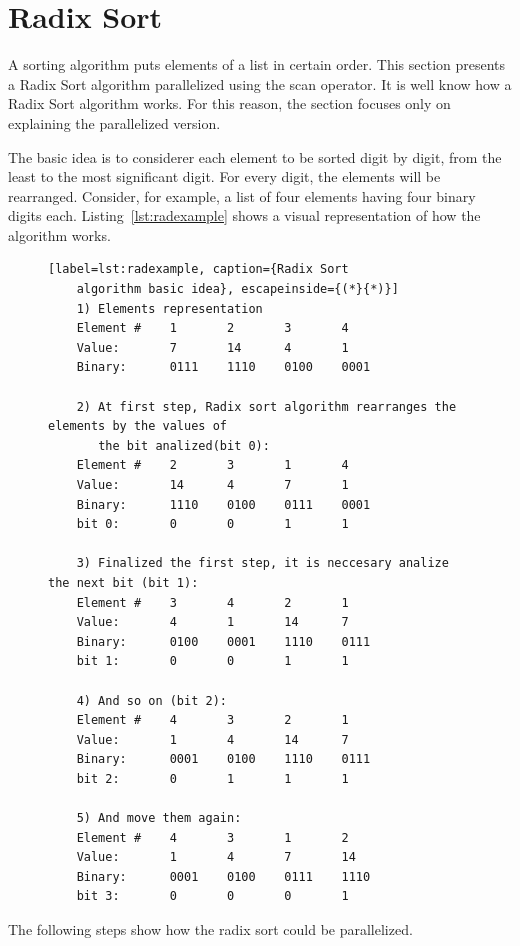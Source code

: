 \documentclass[Ingles]{ic-tese-v1}
\newcommand{\rlst}[1]{Listing~\ref{lst:#1}}
\begin{document}
\section{Radix Sort}
\label{sec:Quicksort}

A sorting algorithm puts elements of a list in certain order. This section
presents a Radix Sort algorithm parallelized using the scan operator. It is
well know how a Radix Sort algorithm works.  For this reason, the section
focuses only on explaining the parallelized version.

The basic idea is to considerer each element to be sorted digit by digit, from
the least to the most significant digit. For every digit, the elements will be rearranged.
Consider, for example, a list of four elements having four binary digits each.
\rlst{radexample} shows a visual representation of how the
algorithm works.

\begin{figure}[t]
	\lstset{basicstyle=\scriptsize}
	\begin{lstlisting}[label=lst:radexample, caption={Radix Sort
	algorithm basic idea}, escapeinside={(*}{*)}]
	1) Elements representation
	Element #    1       2       3       4
	Value:       7       14      4       1
	Binary:      0111    1110    0100    0001

	2) At first step, Radix sort algorithm rearranges the elements by the values of
	   the bit analized(bit 0):
	Element #    2       3       1       4
	Value:       14      4       7       1
	Binary:      1110    0100    0111    0001
	bit 0:       0       0       1       1

	3) Finalized the first step, it is neccesary analize the next bit (bit 1):
	Element #    3       4       2       1
	Value:       4       1       14      7
	Binary:      0100    0001    1110    0111
	bit 1:       0       0       1       1

	4) And so on (bit 2):
	Element #    4       3       2       1
	Value:       1       4       14      7
	Binary:      0001    0100    1110    0111
	bit 2:       0       1       1       1

	5) And move them again:
	Element #    4       3       1       2
	Value:       1       4       7       14
	Binary:      0001    0100    0111    1110
	bit 3:       0       0       0       1

	\end{lstlisting}
\end{figure}

The following steps show how the radix sort could be parallelized.
\end{document}
